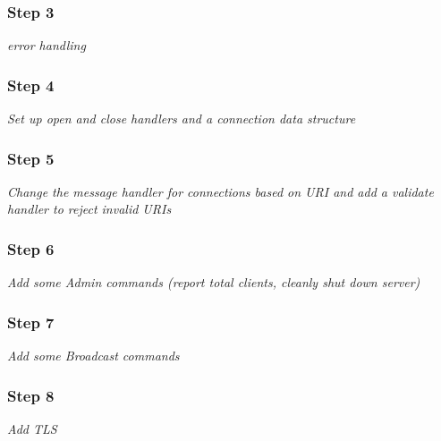\subsubsection*{Step 3}

{\itshape error handling}

\subsubsection*{Step 4}

{\itshape Set up open and close handlers and a connection data structure}

\subsubsection*{Step 5}

{\itshape Change the message handler for connections based on U\+RI and add a validate handler to reject invalid U\+R\+Is}

\subsubsection*{Step 6}

{\itshape Add some Admin commands (report total clients, cleanly shut down server)}

\subsubsection*{Step 7}

{\itshape Add some Broadcast commands}

\subsubsection*{Step 8}

{\itshape Add T\+LS} 